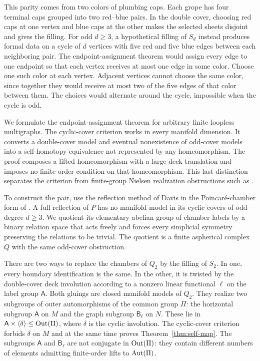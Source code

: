 This parity comes from two colors of plumbing caps.  Each grope has
four terminal caps grouped into two red--blue pairs.  In the double
cover, choosing red caps at one vertex and blue caps at the other
makes the selected sheets disjoint and gives the filling.  For odd
$d\geq3$, a hypothetical filling of $S_d$ instead produces formal data
on a cycle of $d$ vertices with five red and five blue edges between
each neighboring pair.  The endpoint-assignment theorem would assign
every edge to one endpoint so that each vertex receives at most one
edge in some color.  Choose one such color at each vertex.  Adjacent
vertices cannot choose the same color, since together they would receive
at most two of the five edges of that color between them.  The choices
would alternate around the cycle, impossible when the cycle is odd.

We formulate the endpoint-assignment theorem for arbitrary finite
loopless multigraphs.
The cyclic-cover criterion works in every manifold dimension.  It
converts a double-cover model and eventual nonexistence of odd-cover
models into a self-homotopy equivalence not represented by any
homeomorphism.  The proof composes a lifted homeomorphism with a large
deck translation and imposes no finite-order condition on that
homeomorphism.  This last distinction separates the criterion from
finite-group Nielsen realization obstructions such as
\cite[Theorem~1.6]{BlockWeinberger2008}.

To construct the pair, use the reflection method of Davis
\cite{Davis1983,Davis2008} in the Poincar\'e-chamber form of
\cite{PD}.  A full reflection of $P$ has no manifold model in its
cyclic covers of odd degree $d\geq3$.  We quotient its elementary abelian
group of chamber labels by a binary relation space that acts freely
and forces every
simplicial symmetry preserving the relations to be trivial.  The
quotient is a finite aspherical complex $Q$ with the same odd-cover
obstruction.

There are two ways to replace the chambers of $Q_2$ by the filling of
$S_2$.  In one, every boundary identification is the same.  In the
other, it is twisted by the double-cover deck involution according to
a nonzero linear functional $\ell$ on the label group $\mathsf A$.
Both gluings are closed manifold models of $Q_2$.  They realize two
subgroups of outer automorphisms of the common group $\Pi$:
the horizontal subgroup $\mathsf A$ on $M$ and the graph subgroup
$\mathsf B_\ell$ on $N$.  These lie in
$\mathsf A\times\langle\delta\rangle\leq\operatorname{Out}(\Pi)$, where $\delta$ is
the cyclic involution.  The cyclic-cover criterion forbids $\delta$
on $M$ and at the same time proves Theorem~\ref{thm:self-map}.
The subgroups $\mathsf A$ and $\mathsf B_\ell$ are not conjugate in
$\operatorname{Out}(\Pi)$: they contain different numbers of elements admitting
finite-order lifts to $\operatorname{Aut}(\Pi)$.


